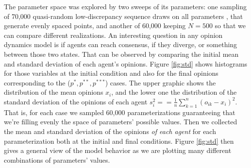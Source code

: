 \documentclass{article}
\begin{document}
The parameter space was explored by two sweeps of its parameters: one sampling
of 70,000 quasi-random low-discrepancy sequence draws on all parameters
\cite{saltelli2008global, saltelli2000sensitivity}, that generate evenly spaced
points, and another of 60,000 keeping \(N=500\) so that we can compare different
realizations. An interesting question in any opinion dynamics model is if agents
can reach consensus, if they diverge, or something between those two states.
That can be observed by comparing the initial mean and standard deviation of
each agent's opinions. Figure \ref{fig:std} shows histograms for those variables
at the initial condition and also for the final opinions corresponding to the
(\(p^{*}, p^{**}, p^{***}\)) cases. The upper graphic shows the distribution of
the mean opinions $x_i$, and the lower one the distribution of the standard
deviation of the opinions of each agent $s_i^2== \frac{1}{n} \sum_{k=1}^{n}
(o_{ik}-x_i)^2$. That is, for each case we sampled 60,000 parameterizations
guaranteeing that we're filling evenly the space of parameters' possible values.
Then we collected the mean and standard deviation of the opinions \textit{of
  each agent} for each parameterization both at the initial and final
conditions. Figure \ref{fig:std} then gives a general view of the model behavior
as we are plotting many different combinations of parameters' values.
\end{document}
